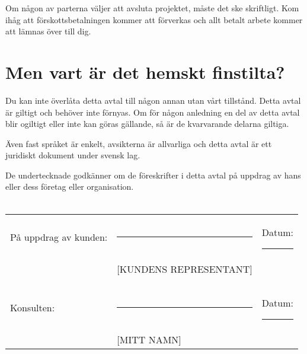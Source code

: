 \documentclass[10pt,a4paper,parskip]{scrartcl}
\begin{document}
Om någon av parterna väljer att avsluta projektet, måste det ske skriftligt.
Kom ihåg att förskottsbetalningen kommer att förverkas och allt betalt arbete
kommer att lämnas över till dig.

\section{Men vart är det hemskt finstilta?}
Du kan inte överlåta detta avtal till någon annan utan vårt tillstånd. Detta
avtal är giltigt och behöver inte förnyas. Om för någon anledning en del av
detta avtal blir ogiltigt eller inte kan göras gällande, så är de kvarvarande
delarna giltiga.

Även fast språket är enkelt, avsikterna är allvarliga och detta avtal är ett
juridiskt dokument under svensk lag.


\vspace{1cm} 

\noindent De undertecknade godkänner om de föreskrifter i detta avtal på
uppdrag av hans eller dess företag eller organisation.\\\\

\noindent \begin{tabular}{l l l}
På uppdrag av kunden: & \rule{6cm}{.2pt}       & Datum: \rule{2.4cm}{.2pt}\\
                      & [KUNDENS REPRESENTANT] & \\\\\\
Konsulten:            & \rule{6cm}{.2pt}       & Datum: \rule{2.4cm}{.2pt}\\
                      & [MITT NAMN]            & \\
\end{tabular}
\end{document}
